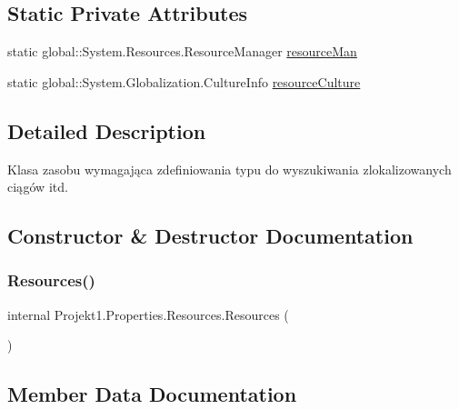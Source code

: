 \subsection*{Static Private Attributes}
\begin{DoxyCompactItemize}
\item 
static global\+::\+System.\+Resources.\+Resource\+Manager \mbox{\hyperlink{class_projekt1_1_1_properties_1_1_resources_a5a79eff92141b0c0f8bf45c028747798}{resource\+Man}}
\item 
static global\+::\+System.\+Globalization.\+Culture\+Info \mbox{\hyperlink{class_projekt1_1_1_properties_1_1_resources_a11433d991400a530b1b3a66759e97064}{resource\+Culture}}
\end{DoxyCompactItemize}


\subsection{Detailed Description}
Klasa zasobu wymagająca zdefiniowania typu do wyszukiwania zlokalizowanych ciągów itd. 



\subsection{Constructor \& Destructor Documentation}
\mbox{\label{class_projekt1_1_1_properties_1_1_resources_af440d94500e352506b0fb2b91289ed59}} 
\subsubsection{\texorpdfstring{Resources()}{Resources()}}
{\footnotesize\ttfamily internal Projekt1.\+Properties.\+Resources.\+Resources (\begin{DoxyParamCaption}{ }\end{DoxyParamCaption})\hspace{0.3cm}{\ttfamily [private]}}



\subsection{Member Data Documentation}
\mbox{\label{class_projekt1_1_1_properties_1_1_resources_a11433d991400a530b1b3a66759e97064}} 
